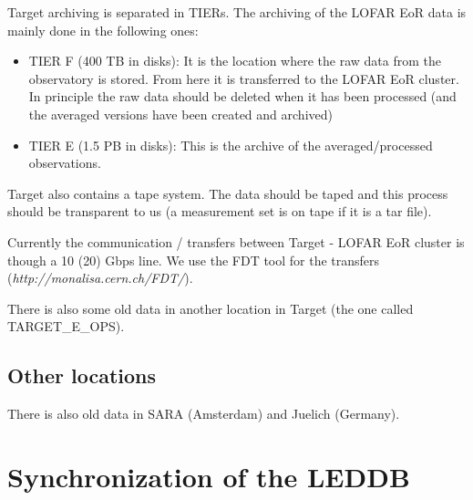 \documentclass[a4paper,11pt]{article}
\begin{document}
Target archiving is separated in TIERs. The archiving of the LOFAR EoR data is mainly done in the following ones:

\begin{itemize}
	\item TIER F (400 TB in disks): It is the location where the raw data from the observatory is stored. From here it is transferred to the LOFAR EoR cluster. In principle the raw data should be deleted when it has been processed (and the averaged versions have been created and archived)
	\item TIER E (1.5 PB in disks): This is the archive of the averaged/processed observations.
\end{itemize} 

Target also contains a tape system. The data should be taped and this process should be transparent to us (a measurement set is on tape if it is a tar file).

Currently the communication / transfers between Target - LOFAR EoR cluster is though a 10 (20) Gbps line. We use the FDT tool for the transfers (\textit{http://monalisa.cern.ch/FDT/}).

There is also some old data in another location in Target (the one called TARGET\_E\_OPS).

\subsection{Other locations}

There is also old data in SARA (Amsterdam) and Juelich (Germany).

\section{Synchronization of the LEDDB}
\end{document}
